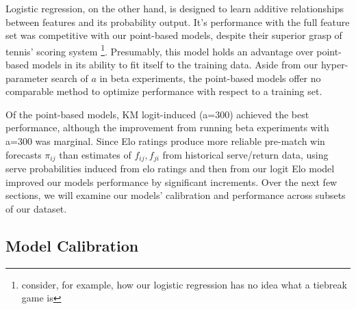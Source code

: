 \documentclass[chapterprefix=false]{report}
\begin{document}
Logistic regression, on the other hand, is designed to  learn additive relationships between features and its probability output. It's performance with the full feature set was competitive with our point-based models, despite their superior grasp of tennis' scoring system \footnote{consider, for example, how our logistic regression has no idea what a tiebreak game is}. Presumably, this model holds an advantage over point-based models in its ability to fit itself to the training data. Aside from our hyper-parameter search of $a$ in beta experiments, the point-based models offer no comparable method to optimize performance with respect to a training set.


Of the point-based models, KM logit-induced (a=300) achieved the best performance, although the improvement from running beta experiments with a=300 was marginal. Since Elo ratings produce more reliable pre-match win forecasts $\pi_{ij}$ than estimates of $f_{ij},f_{ji}$ from historical serve/return data, using serve probabilities induced from elo ratings and then from our logit Elo model improved our models performance by significant increments. Over the next few sections, we will examine our models' calibration and performance across subsets of our dataset.


\subsection{Model Calibration}
\end{document}
